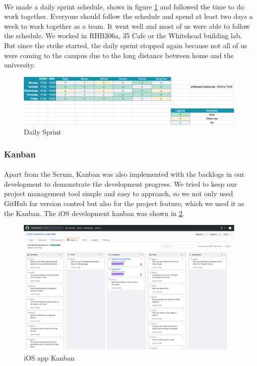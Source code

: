 \documentclass[12pt,a4paper]{article}
\begin{document}
          \paragraph{}We made a daily sprint schedule, shows in figure \ref{fig:Daily Sprint} and followed the time to do work together. Everyone should follow the schedule and spend at least two days a week to work together as a team. It went well and most of us were able to follow the schedule. We worked in RHB306a, 35 Cafe or the Whitehead building lab. But since the strike started, the daily sprint stopped again because not all of us were coming to the campus due to the long distance between home and the university. 

          \begin{figure}[H]
            \centering
            \includegraphics[width=1\textwidth]{../assets/development-records-daily-sprint.png}
            \caption{Daily Sprint}
            \label{fig:Daily Sprint}
          \end{figure}

        \subsubsection{Kanban}
          \paragraph{}Apart from the Scrum, Kanban was also implemented with the backlogs in our development to demonstrate the development progress. We tried to keep our project management tool simple and easy to approach, so we not only used GitHub for version control but also for the project feature, which we used it as the Kanban. The iOS  development kanban was shown in \ref{fig:iOS Development Kanban}.

          \begin{figure}[H]
            \centering
            \includegraphics[width=1\textwidth]{../assets/development-records-ios-kanban.png}
            \caption{iOS app Kanban}
            \label{fig:iOS Development Kanban}
          \end{figure}
         
\end{document}
